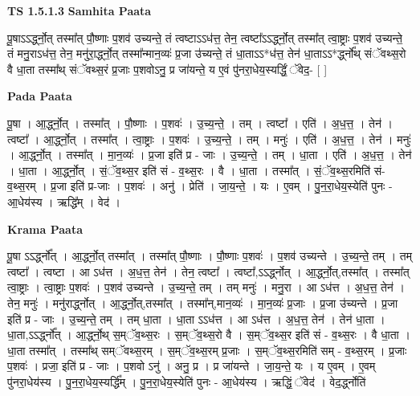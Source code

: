 \documentclass[17pt]{extarticle}
\begin{document}
\textbf{TS 1.5.1.3 } \newline
\textbf{Samhita Paata} \newline

पू॒षाऽऽर्द्ध्नो॒त् तस्मा᳚त् पौ॒ष्णाः प॒शव॑ उच्यन्ते॒ तं त्वष्टाऽऽध॑त्त॒ तेन॒ त्वष्टा᳚ऽऽर्द्ध्नो॒त् तस्मा᳚त् त्वा॒ष्ट्राः प॒शव॑ उच्यन्ते॒ तं मनु॒राऽध॑त्त॒ तेन॒ मनु॑रा॒र्द्ध्नो॒त् तस्मा᳚न्मान॒व्यः॑ प्र॒जा उ॑च्यन्ते॒ तं धा॒ताऽऽ*ध॑त्त॒ तेन॑ धा॒ताऽऽ*र्द्ध्नो᳚थ् संॅवथ्स॒रो वै धा॒ता तस्मा᳚थ् संॅवथ्स॒रं प्र॒जाः प॒शवोऽनु॒ प्र जा॑यन्ते॒ य ए॒वं पु॑नरा॒धेय॒स्यर्द्धिं॒ ॅवेद॒- [ ] \newline

\textbf{Pada Paata} \newline

पू॒षा । आ॒र्द्ध्नो॒त् । तस्मा᳚त् । पौ॒ष्णाः । प॒शवः॑ । उ॒च्य॒न्ते॒ । तम् । त्वष्टा᳚ । एति॑ । अ॒ध॒त्त॒ । तेन॑ । त्वष्टा᳚ । आ॒र्द्ध्नो॒त् । तस्मा᳚त् । त्वा॒ष्ट्राः । प॒शवः॑ । उ॒च्य॒न्ते॒ । तम् । मनुः॑ । एति॑ । अ॒ध॒त्त॒ । तेन॑ । मनुः॑ । आ॒र्द्ध्नो॒त् । तस्मा᳚त् । मा॒न॒व्यः॑ । प्र॒जा इति॑ प्र - जाः । उ॒च्य॒न्ते॒ । तम् । धा॒ता । एति॑ । अ॒ध॒त्त॒ । तेन॑ । धा॒ता । आ॒र्द्ध्नो॒त् । सं॒ॅव॒थ्स॒र इति॑ सं - व॒थ्स॒रः । वै । धा॒ता । तस्मा᳚त् । सं॒ॅव॒थ्स॒रमिति॑ सं-व॒थ्स॒रम् । प्र॒जा इति॑ प्र-जाः । प॒शवः॑ । अनु॑ । प्रेति॑ । जा॒य॒न्ते॒ । यः । ए॒वम् । पु॒न॒रा॒धेय॒स्येति॑ पुनः - आ॒धेय॑स्य । ऋद्धि᳚म् । वेद॑ ।  \newline


\textbf{Krama Paata} \newline

पू॒षा ऽऽर्द्ध्नो᳚त् । आ॒र्द्ध्नो॒त् तस्मा᳚त् । तस्मा᳚त् पौ॒ष्णाः । पौ॒ष्णाः प॒शवः॑ । प॒शव॑ उच्यन्ते । उ॒च्य॒न्ते॒ तम् । तम् त्वष्टा᳚ । त्वष्टा । आ ऽध॑त्त । अ॒ध॒त्त॒ तेन॑ । तेन॒ त्वष्टा᳚ । त्वष्टा᳚,ऽऽर्द्ध्नोत् । आ॒र्द्ध्नो॒त्,तस्मा᳚त् । तस्मा᳚त् त्वा॒ष्ट्राः । त्वा॒ष्ट्राः प॒शवः॑ । प॒शव॑ उच्यन्ते । उ॒च्य॒न्ते॒ तम् । तम् मनुः॑ । मनु॒रा । आ ऽध॑त्त । अ॒ध॒त्त॒ तेन॑ । तेन॒ मनुः॑ । मनु॑रार्द्ध्नोत् । आ॒र्द्ध्नो॒त्,तस्मा᳚त् । तस्मा᳚न्,मान॒व्यः॑ । मा॒न॒व्यः॑ प्र॒जाः । प्र॒जा उ॑च्यन्ते । प्र॒जा इति॑ प्र - जाः । उ॒च्य॒न्ते॒ तम् । तम् धा॒ता । धा॒ता ऽऽध॑त्त । आ ऽध॑त्त । अ॒ध॒त्त॒ तेन॑ । तेन॑ धा॒ता । धा॒ता,ऽऽर्द्ध्नो᳚त् । आ॒र्द्ध्नो॒थ् स॒म्ॅव॒थ्स॒रः । स॒म्ॅव॒थ्स॒रो वै । स॒म्ॅव॒थ्स॒र इति॑ सं - व॒थ्स॒रः । वै धा॒ता । धा॒ता तस्मा᳚त् । तस्मा᳚थ् सम्ॅवथ्स॒रम् । स॒म्ॅव॒थ्स॒रम् प्र॒जाः । स॒म्ॅव॒थ्स॒रमिति॑ सम् - व॒थ्स॒रम् । प्र॒जाः प॒शवः॑ । प्रजा॒ इति॑ प्र - जाः । प॒शवो ऽनु॑ । अनु॒ प्र । प्र जा॑यन्ते । जा॒य॒न्ते॒ यः । य ए॒वम् । ए॒वम् पु॑नरा॒धेय॑स्य । पु॒न॒रा॒धेय॒स्यर्द्धि᳚म् । पु॒न॒रा॒धेय॒स्येति॑ पुनः - आ॒धेय॑स्य । ऋद्धिं॒ ॅवेद॑ । वेद॒र्द्ध्नोति॑ \newline
\end{document}
